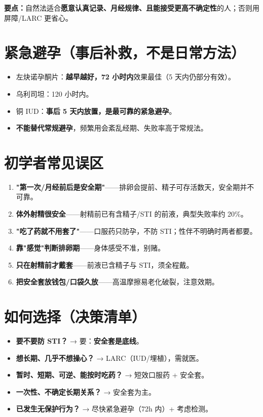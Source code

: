 \documentclass[12pt,UTF8,openany]{ctexbook}
\begin{document}
\noindent\textbf{要点：}自然法适合\textbf{愿意认真记录、月经规律、且能接受更高不确定性}的人；否则用屏障/LARC 更省心。

\section{紧急避孕（事后补救，不是日常方法）}

\begin{itemize}[leftmargin=2em,itemsep=0.3em]
  \item 左炔诺孕酮片：\textbf{越早越好，72 小时内}效果最佳（5 天内仍部分有效）。
  \item 乌利司坦：120 小时内。
  \item 铜 IUD：\textbf{事后 5 天内放置，是最可靠的紧急避孕}。
  \item \textbf{不能替代常规避孕}，频繁用会紊乱经期、失败率高于常规法。
\end{itemize}

\section{初学者常见误区}

\begin{enumerate}[leftmargin=2em,itemsep=0.3em]
  \item \textbf{"第一次/月经前后是安全期"}——排卵会提前、精子可存活数天，安全期并不可靠。
  \item \textbf{体外射精很安全}——射精前已有含精子/STI 的前液，典型失败率约 20\%。
  \item \textbf{"吃了药就不用套了"}——口服药只防孕，不防 STI；性伴不明确时两者都要。
  \item \textbf{靠"感觉"判断排卵期}——身体感受不准，别赌。
  \item \textbf{只在射精前才戴套}——前液已含精子与 STI，须全程戴。
  \item \textbf{把安全套放钱包/口袋久放}——高温摩擦易老化破裂，注意效期。
\end{enumerate}

\section{如何选择（决策清单）}

\begin{itemize}[leftmargin=2em,itemsep=0.3em]
  \item \textbf{要不要防 STI？} → 要：\textbf{安全套是底线}。
  \item \textbf{想长期、几乎不想操心？} → LARC（IUD/埋植），需就医。
  \item \textbf{暂时、短期、可逆、能按时吃药？} → 短效口服药 + 安全套。
  \item \textbf{一次性、不确定长期关系？} → 安全套为主。
  \item \textbf{已发生无保护行为？} → 尽快紧急避孕（72h 内）+ 考虑检测。
\end{itemize}
\end{document}
